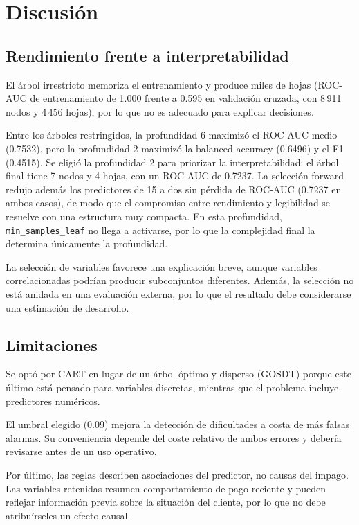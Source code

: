 \chapter{Discusión} \label{chp:discussion}


\section{Rendimiento frente a interpretabilidad}

El árbol irrestricto memoriza el entrenamiento y produce miles de hojas
(ROC-AUC de entrenamiento de 1.000 frente a 0.595 en validación cruzada, con
8\,911 nodos y 4\,456 hojas), por lo que no es adecuado para explicar decisiones.

Entre los árboles restringidos, la profundidad 6 maximizó el ROC-AUC medio
(0.7532), pero la profundidad 2 maximizó la balanced accuracy (0.6496) y el F1
(0.4515). Se eligió la profundidad 2 para priorizar la interpretabilidad: el
árbol final tiene 7 nodos y 4 hojas, con un ROC-AUC de 0.7237. La selección
forward redujo además los predictores de 15 a dos sin pérdida de ROC-AUC
(0.7237 en ambos casos), de modo que el compromiso entre rendimiento y
legibilidad se resuelve con una estructura muy compacta. En esta profundidad,
\texttt{min_samples_leaf} no llega a activarse, por lo que la complejidad final
la determina únicamente la profundidad.

La selección de variables favorece una explicación breve, aunque variables
correlacionadas podrían producir subconjuntos diferentes. Además, la selección
no está anidada en una evaluación externa, por lo que el resultado debe
considerarse una estimación de desarrollo.

\section{Limitaciones}

Se optó por CART en lugar de un árbol óptimo y disperso (GOSDT) porque este
último está pensado para variables discretas, mientras que el problema incluye
predictores numéricos.

El umbral elegido (0.09) mejora la detección de dificultades a costa de más
falsas alarmas. Su conveniencia depende del coste relativo de ambos errores y
debería revisarse antes de un uso operativo.

Por último, las reglas describen asociaciones del predictor, no causas del
impago. Las variables retenidas resumen comportamiento de pago reciente y pueden
reflejar información previa sobre la situación del cliente, por lo que no debe
atribuírseles un efecto causal.
